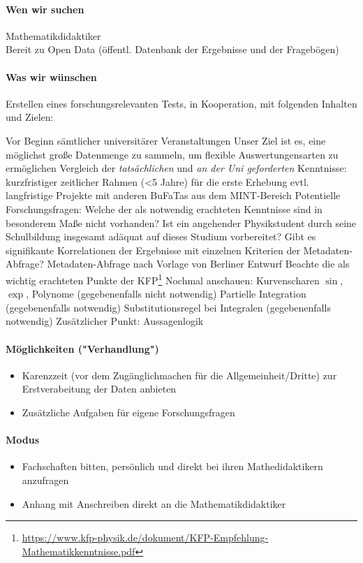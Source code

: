 		\paragraph{Wen wir suchen}
			Mathematikdidaktiker \\
			Bereit zu Open Data (öffentl. Datenbank der Ergebnisse und der Fragebögen)

		\paragraph{Was wir wünschen}
			Erstellen eines forschungsrelevanten Tests, in Kooperation, mit folgenden Inhalten und Zielen:
			\begin{outline}
				\1 Vor Beginn sämtlicher universitärer Veranstaltungen
				\1 Unser Ziel ist es, eine möglichst große Datenmenge zu sammeln, um flexible Auswertungensarten zu ermöglichen
				\1 Vergleich der \textit{tatsächlichen} und \textit{an der Uni geforderten} Kenntnisse:
					\2 kurzfristiger zeitlicher Rahmen (<5 Jahre) für die erste Erhebung
					\2 evtl. langfristige Projekte mit anderen BuFaTas aus dem MINT-Bereich
				\1 Potentielle Forschungsfragen:
					\2 Welche der als notwendig erachteten Kenntnisse sind in besonderem Maße nicht vorhanden?
					\2 Ist ein angehender Physikstudent durch seine Schulbildung insgesamt adäquat auf dieses Studium vorbereitet?
					\2 Gibt es signifikante Korrelationen der Ergebnisse mit einzelnen Kriterien der Metadaten-Abfrage?
				\1 Metadaten-Abfrage nach Vorlage von Berliner Entwurf
				\1 Beachte die als wichtig erachteten Punkte der KFP\footnote{\url{https://www.kfp-physik.de/dokument/KFP-Empfehlung-Mathematikkenntnisse.pdf}}
				\1 Nochmal anschauen:
					\2 Kurvenscharen $\sin$, $\exp$, Polynome (gegebenenfalls nicht notwendig)
					\2 Partielle Integration (gegebenenfalls notwendig)
					\2 Substitutionsregel bei Integralen (gegebenenfalls notwendig)
				\1 Zusätzlicher Punkt:
					\2 Aussagenlogik
			\end{outline}

		\paragraph{Möglichkeiten ("Verhandlung")}
			\begin{itemize}
				\item Karenzzeit (vor dem Zugänglichmachen für die Allgemeinheit/Dritte) zur Erstverabeitung der Daten anbieten
				\item Zusätzliche Aufgaben für eigene Forschungsfragen
			\end{itemize}

		\paragraph{Modus}
			\begin{itemize}
				\item Fachschaften bitten, persönlich und direkt bei ihren Mathedidaktikern anzufragen
				\item Anhang mit Anschreiben direkt an die Mathematikdidaktiker
			\end{itemize}
